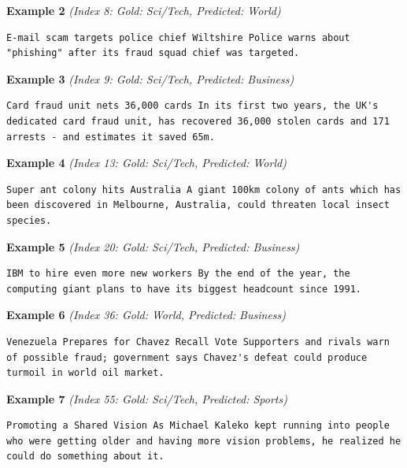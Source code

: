 \noindent
\textbf{Example 2} \quad \textit{(Index 8: Gold: Sci/Tech, Predicted: World)}

\begin{Verbatim}[breaklines=true,breakanywhere=true,fontsize=\small]
E-mail scam targets police chief Wiltshire Police warns about "phishing" after its fraud squad chief was targeted.
\end{Verbatim}

\noindent
\textbf{Example 3} \quad \textit{(Index 9: Gold: Sci/Tech, Predicted: Business)}

\begin{Verbatim}[breaklines=true,breakanywhere=true,fontsize=\small]
Card fraud unit nets 36,000 cards In its first two years, the UK's dedicated card fraud unit, has recovered 36,000 stolen cards and 171 arrests - and estimates it saved 65m.
\end{Verbatim}

\noindent
\textbf{Example 4} \quad \textit{(Index 13: Gold: Sci/Tech, Predicted: World)}

\begin{Verbatim}[breaklines=true,breakanywhere=true,fontsize=\small]
Super ant colony hits Australia A giant 100km colony of ants which has been discovered in Melbourne, Australia, could threaten local insect species.
\end{Verbatim}

\noindent
\textbf{Example 5} \quad \textit{(Index 20: Gold: Sci/Tech, Predicted: Business)}

\begin{Verbatim}[breaklines=true,breakanywhere=true,fontsize=\small]
IBM to hire even more new workers By the end of the year, the computing giant plans to have its biggest headcount since 1991.
\end{Verbatim}

\noindent
\textbf{Example 6} \quad \textit{(Index 36: Gold: World, Predicted: Business)}

\begin{Verbatim}[breaklines=true,breakanywhere=true,fontsize=\small]
Venezuela Prepares for Chavez Recall Vote Supporters and rivals warn of possible fraud; government says Chavez's defeat could produce turmoil in world oil market.
\end{Verbatim}

\noindent
\textbf{Example 7} \quad \textit{(Index 55: Gold: Sci/Tech, Predicted: Sports)}

\begin{Verbatim}[breaklines=true,breakanywhere=true,fontsize=\small]
Promoting a Shared Vision As Michael Kaleko kept running into people who were getting older and having more vision problems, he realized he could do something about it.
\end{Verbatim}

